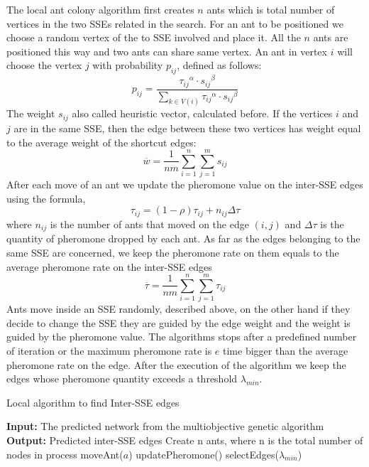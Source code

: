 The local ant colony algorithm first creates $n$ ants which is total number of vertices in the two SSEs related in the search. For an ant to be positioned we choose a random vertex of the to SSE involved and place it. All the $n$ ants are positioned this way and two ants can share same vertex. An ant in vertex $i$ will choose the vertex $j$ with probability $p_{ij}$, defined as follows:
\begin{equation}
p_{ij} = \frac{{\tau_{ij}}^\alpha \cdot {s_{ij}}^\beta}{\sum\nolimits_{k\in V(i)} {\tau_{ij}}^\alpha \cdot {s_{ij}}^\beta}
\end {equation}
The weight $s_{ij}$ also called heuristic vector, calculated before. If the vertices $i$ and $j$ are in the same SSE, then the edge between these two vertices has weight equal to the average weight of the shortcut edges:
\begin{equation}
\overline{w} = \frac{1}{nm} \sum_{i=1}^n\sum_{j=1}^m s_{ij}
\end{equation}
After each move of an ant we update the pheromone value on the inter-SSE edges using the formula,
\begin{equation}
\tau_{ij} = (1 - \rho) \tau_{ij} + n_{ij} \Delta \tau
\end{equation}
where $n_{ij}$ is the number of ants that moved on the edge $(i, j)$ and $\Delta\tau$ is the quantity of pheromone dropped by each ant. As far as the edges belonging to the same SSE are concerned, we keep the pheromone rate on them equals to the average pheromone rate on the inter-SSE edges
\begin{equation}
\overline{\tau} = \frac{1}{nm} \sum_{i=1}^n\sum_{j=1}^m \tau_{ij}
\end{equation}
Ants move inside an SSE randomly, described above, on the other hand if they decide to change the SSE they are guided by the edge weight and the weight is guided by the pheromone value. The algorithms stops after a predefined number of iteration or the maximum pheromone rate is $e$ time bigger than the average pheromone rate on the edge. After the execution of the algorithm we keep the edges whose pheromone quantity exceeds a threshold $\lambda_{min}$.
\begin{algorithm}
\caption{Local algorithm to find Inter-SSE edges}
\label{alg:local}
\begin{algorithmic}[1]
\STATE \textbf{Input:} The predicted network from the multiobjective genetic algorithm
\STATE \textbf{Output:} Predicted inter-SSE edges 
\STATE Create n ants, where n is the total number of nodes in process
\STATE moveAnt($a$)
\ENDFOR
\STATE updatePheromone()
\ENDWHILE
\STATE selectEdges($\lambda_{min}$)
\end{algorithmic}
\end{algorithm}
